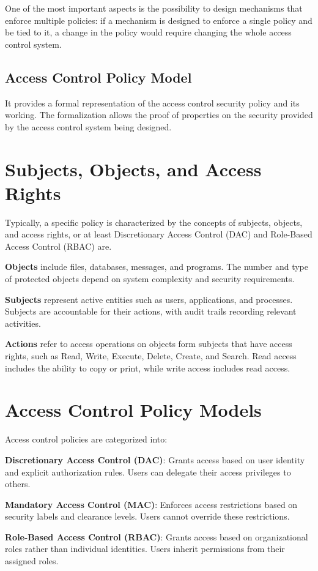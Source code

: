 One of the most important aspects is the possibility to design
mechanisms that enforce multiple policies: if a mechanism is designed
to enforce a single policy and be tied to it, a change in the policy
would require changing the whole access control system.

\subsection{Access Control Policy Model}
It provides a formal representation of the access control security
policy and its working. The formalization allows the proof of
properties on the security provided by the access control system being
designed.

\section{Subjects, Objects, and Access Rights}
Typically, a specific policy is characterized by the concepts of
subjects, objects, and access rights, or at least Discretionary Access
Control (DAC) and Role-Based Access Control (RBAC) are.

\textbf{Objects} include files, databases, messages, and programs. The number
and type of protected objects depend on system complexity and security
requirements.

\textbf{Subjects} represent active entities such as users, applications, and
processes. Subjects are accountable for their actions, with audit trails
recording relevant activities.

\textbf{Actions} refer to access operations on objects form subjects
that have access rights, such as Read, Write, Execute, Delete, Create,
and Search. Read access includes the ability to copy or print, while
write access includes read access.

\section{Access Control Policy Models}
Access control policies are categorized into:

\textbf{Discretionary Access Control (DAC)}: Grants access based on user
identity and explicit authorization rules. Users can delegate their access
privileges to others.

\textbf{Mandatory Access Control (MAC)}: Enforces access restrictions based on
security labels and clearance levels. Users cannot override these restrictions.

\textbf{Role-Based Access Control (RBAC)}: Grants access based on
organizational roles rather than individual identities. Users inherit
permissions from their assigned roles.

